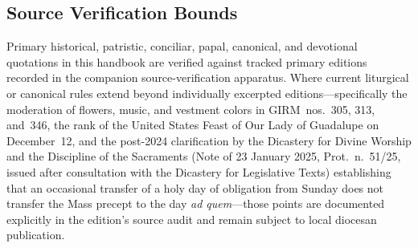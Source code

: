 \subsection{Source Verification Bounds}

Primary historical, patristic, conciliar, papal, canonical, and devotional quotations in this handbook are verified against tracked primary editions recorded in the companion source-verification apparatus. Where current liturgical or canonical rules extend beyond individually excerpted editions---specifically the moderation of flowers, music, and vestment colors in GIRM~nos.~305, 313, and~346, the rank of the United States Feast of Our Lady of Guadalupe on December~12, and the post-2024 clarification by the Dicastery for Divine Worship and the Discipline of the Sacraments (Note of 23 January 2025, Prot.~n.~51/25, issued after consultation with the Dicastery for Legislative Texts) establishing that an occasional transfer of a holy day of obligation from Sunday does not transfer the Mass precept to the day \textit{ad quem}---those points are documented explicitly in the edition's source audit and remain subject to local diocesan publication.

